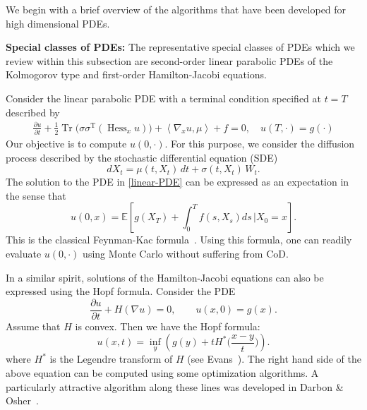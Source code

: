 \documentclass[12pt]{article}
\theoremstyle{definition}
\DeclareMathOperator{\Tr}{Tr}
\newcommand{\E}{\mathbb{E}}
\newcommand{\bx}{{x}}
\newcommand{\bX}{{X}}
\begin{document}
We begin with a brief overview of the algorithms that have been developed for high dimensional PDEs.

\vspace{.1in}
\noindent
{\bf Special classes of PDEs:} 
The representative special classes of PDEs 
which we review within this subsection  
are second-order linear parabolic PDEs of the Kolmogorov type 
and first-order Hamilton-Jacobi equations. 

Consider the linear parabolic PDE with a terminal condition specified at $ t = T $ described by
  \begin{align}
  \label{linear-PDE}
    \frac{ \partial u}{ \partial t } 
    + \frac{1}{2} \! \Tr\!\big( \sigma\sigma^{\operatorname{T}}( \operatorname{Hess}_x u) \big)
    + \left< \nabla_x u, \mu \right> + f = 0, \quad u(T, \cdot) = g(\cdot)
  \end{align}
Our objective is to compute $ u(0, \cdot)$. 
For this purpose, we consider the diffusion process described by 
the stochastic differential equation (SDE)
\begin{equation}
  d\bX_t = \mu( t, \bX_t )\, dt + \sigma( t, \bX_t ) \, W_t .
\end{equation}
The solution to the PDE in \eqref{linear-PDE} can be expressed 
as an expectation in the sense that
\begin{equation}
  u(0,\bx) = \E\!\left[ g(\bX_T)+\int_0^T f(s, \bX_s) ds \, \bigg| \bX_0=\bx \right].
\end{equation}
This is the classical  Feynman-Kac formula~\cite{Karatzas1998,oksendal2013stochastic}.
Using this formula, one can readily evaluate $u(0, \cdot)$ using Monte Carlo without suffering from CoD. 



In a similar spirit, solutions of the Hamilton-Jacobi equations 
can also be expressed using the Hopf formula.  
Consider the PDE
\begin{equation}
  \frac{ \partial u }{ \partial t } + H( \nabla u ) = 0, \qquad u(\bx, 0) = g(\bx).
\end{equation}
Assume that $H$ is convex.  Then we have the Hopf formula:
\begin{equation}
u(\bx, t) = \inf_{y} \left( g(y) + t H^*\Big(\frac{\bx - y}{t}\Big) \right).
\end{equation}
where $H^*$ is the Legendre transform of $ H $ (see Evans~\cite{Evans2010partial}). 
The right hand side of the above equation can be computed using
some optimization algorithms. 
A particularly attractive algorithm along these lines 
was developed in Darbon \& Osher~\cite{DarbonOsher2016}.
\end{document}
